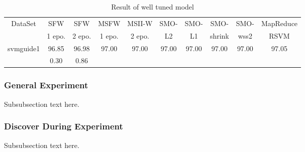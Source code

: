 \documentclass[conference]{IEEEtran}
\begin{document}
\begin{table}[!t]
\renewcommand{\arraystretch}{1.3}
\caption{Result of well tuned model}
\label{table_example}
\centering
\begin{tabular}{|c|c|c|c|c|c|c|c|c|c|}
\hline
DataSet & SFW & SFW & MSFW & MSII-W & SMO- & SMO- & SMO- & SMO-& MapReduce\\
& 1 epo. & 2 epo. & 1 epo. & 2 epo. & L2 & L1 & shrink & wss2 & RSVM\\
\hline
\multirow{2}{*}{svmguide1} & 
96.85 & 96.98 & 97.00 & 97.00 & 97.00 & 97.00 & 97.00 & 97.00 & 97.05\\
\cline{2-10}
& 0.30 & 0.86 & & & & & & &\\
\hline
\end{tabular}
\end{table}

\subsubsection{General Experiment}
Subsubsection text here.

\subsubsection{Discover During Experiment}
Subsubsection text here.
\end{document}
